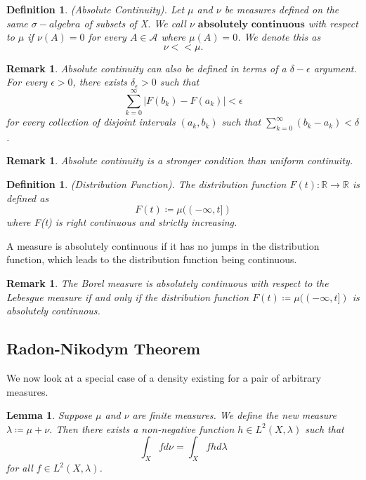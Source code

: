 \documentclass[twoside]{article}
\newtheorem{lemma}[theorem]{Lemma}
\newtheorem{remark}[theorem]{Remark}
\newtheorem{definition}[theorem]{Definition}
\newcommand{\sa}{\sigma-algebra}
\begin{document}
\begin{definition}(Absolute Continuity). Let $\mu$ and $\nu$ be measures defined on the same $\sa$ of subsets of X. We call $\nu$ $\textbf{absolutely continuous}$ with respect to $\mu$ if $\nu(A) = 0$ for every $A \in \mathcal{A}$ where $\mu(A) = 0$. We denote this as
$$
\nu << \mu.
$$
\end{definition}

\begin{remark} Absolute continuity can also be defined in terms of a $\delta - \epsilon$ argument. For every $\epsilon > 0$, there exists $\delta_{\epsilon} > 0$ such that
$$
\sum_{k=0}^{\infty}|F(b_k) - F(a_k)| < \epsilon
$$
for every collection of disjoint intervals $(a_k,b_k)$ such that $\sum_{k=0}^{\infty}(b_k - a_k) < \delta$. 
\end{remark}
\begin{remark} Absolute continuity is a stronger condition than uniform continuity.
\end{remark}

\begin{definition}(Distribution Function). The distribution function $F(t): \mathbb{R} \rightarrow \mathbb{R}$ is defined as 
$$
F(t) \coloneqq \mu((-\infty, t])
$$
where F(t) is right continuous and strictly increasing.
\end{definition}

A measure is absolutely continuous if it has no jumps in the distribution function, which leads to the distribution function being continuous.

\begin{remark} The Borel measure is absolutely continuous with respect to the Lebesgue measure if and only if the distribution function $F(t) \coloneqq \mu((-\infty, t])$ is absolutely continuous.
\end{remark}

\subsection{Radon-Nikodym Theorem}

We now look at a special case of a density existing for a pair of arbitrary measures.

\begin{lemma} Suppose $\mu$ and $\nu$ are finite measures. We define the new measure $\lambda \coloneqq \mu + \nu$. Then there exists a non-negative function $h \in L^2(X, \lambda)$ such that
$$
\int_Xfd\nu = \int_Xfhd\lambda
$$
for all $f \in L^2(X,\lambda)$.
\end{lemma}
\end{document}

